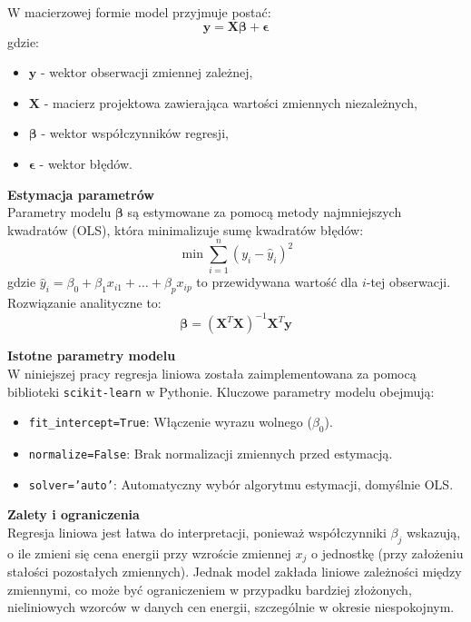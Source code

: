 W macierzowej formie model przyjmuje postać:
\begin{equation}
\mathbf{y} = \mathbf{X} \boldsymbol{\beta} + \boldsymbol{\epsilon}
\end{equation}
gdzie:
\begin{itemize}
    \item \( \mathbf{y} \) - wektor obserwacji zmiennej zależnej,
    \item \( \mathbf{X} \) - macierz projektowa zawierająca wartości zmiennych niezależnych,
    \item \( \boldsymbol{\beta} \) - wektor współczynników regresji,
    \item \( \boldsymbol{\epsilon} \) - wektor błędów.
\end{itemize}

\textbf{Estymacja parametrów} \\
Parametry modelu \( \boldsymbol{\beta} \) są estymowane za pomocą metody najmniejszych kwadratów (OLS), która minimalizuje sumę kwadratów błędów:
\begin{equation}
\min \sum_{i=1}^n (y_i - \hat{y}_i)^2
\end{equation}
gdzie \( \hat{y}_i = \beta_0 + \beta_1 x_{i1} + \dots + \beta_p x_{ip} \) to przewidywana wartość dla \( i \)-tej obserwacji. Rozwiązanie analityczne to:
\begin{equation}
\boldsymbol{\beta} = (\mathbf{X}^T \mathbf{X})^{-1} \mathbf{X}^T \mathbf{y}
\end{equation}

\textbf{Istotne parametry modelu} \\
W niniejszej pracy regresja liniowa została zaimplementowana za pomocą biblioteki \texttt{scikit-learn} w Pythonie. Kluczowe parametry modelu obejmują:
\begin{itemize}
    \item \texttt{fit\_intercept=True}: Włączenie wyrazu wolnego (\( \beta_0 \)).
    \item \texttt{normalize=False}: Brak normalizacji zmiennych przed estymacją.
    \item \texttt{solver='auto'}: Automatyczny wybór algorytmu estymacji, domyślnie OLS.
\end{itemize}

\textbf{Zalety i ograniczenia} \\
Regresja liniowa jest łatwa do interpretacji, ponieważ współczynniki \( \beta_j \) wskazują, o ile zmieni się cena energii przy wzroście zmiennej \( x_j \) o jednostkę (przy założeniu stałości pozostałych zmiennych). Jednak model zakłada liniowe zależności między zmiennymi, co może być ograniczeniem w przypadku bardziej złożonych, nieliniowych wzorców w danych cen energii, szczególnie w okresie niespokojnym.

